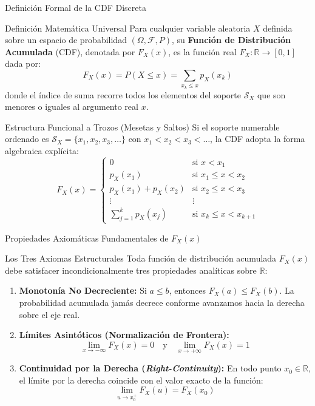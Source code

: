 \documentclass[10pt, aspectratio=169]{beamer}
\begin{document}
\begin{frame}{Definición Formal de la CDF Discreta}
  \fontsize{7.5pt}{9pt}\selectfont
  \begin{block}{Definición Matemática Universal}
    \fontsize{7.5pt}{9pt}\selectfont
    Para cualquier variable aleatoria $X$ definida sobre un espacio de probabilidad $(\Omega, \mathcal{F}, P)$, su \textbf{Función de Distribución Acumulada} (CDF), denotada por $F_X(x)$, es la función real $F_X: \mathbb{R} \to [0, 1]$ dada por:
    $$F_X(x) = P(X \le x) = \sum_{x_k \le x} p_X(x_k)$$
    donde el índice de suma recorre todos los elementos del soporte $\mathcal{S}_X$ que son menores o iguales al argumento real $x$.
  \end{block}
  \vspace{-0.15cm}
  \pause
  \begin{alertblock}{Estructura Funcional a Trozos (Mesetas y Saltos)}
    \fontsize{7.5pt}{9pt}\selectfont
    Si el soporte numerable ordenado es $\mathcal{S}_X = \{x_1, x_2, x_3, \dots\}$ con $x_1 < x_2 < x_3 < \dots$, la CDF adopta la forma algebraica explícita:
    $$F_X(x) = \begin{cases}
      0 & \text{si } x < x_1 \\
      p_X(x_1) & \text{si } x_1 \le x < x_2 \\
      p_X(x_1) + p_X(x_2) & \text{si } x_2 \le x < x_3 \\
      \vdots & \vdots \\
      \sum_{j=1}^k p_X(x_j) & \text{si } x_k \le x < x_{k+1}
    \end{cases}$$
  \end{alertblock}
\end{frame}

\begin{frame}{Propiedades Axiomáticas Fundamentales de $F_X(x)$}
  \begin{block}{Los Tres Axiomas Estructurales}
    Toda función de distribución acumulada $F_X(x)$ debe satisfacer incondicionalmente tres propiedades analíticas sobre $\mathbb{R}$:
    \begin{enumerate}\itemsep=0.15cm
      \item \textbf{Monotonía No Decreciente:} Si $a \le b$, entonces $F_X(a) \le F_X(b)$. La probabilidad acumulada jamás decrece conforme avanzamos hacia la derecha sobre el eje real.
      \item \textbf{Límites Asintóticos (Normalización de Frontera):}
      $$\lim_{x \to -\infty} F_X(x) = 0 \quad \text{y} \quad \lim_{x \to +\infty} F_X(x) = 1$$
      \item \textbf{Continuidad por la Derecha (\emph{Right-Continuity}):} En todo punto $x_0 \in \mathbb{R}$, el límite por la derecha coincide con el valor exacto de la función:
      $$\lim_{u \to x_0^+} F_X(u) = F_X(x_0)$$
    \end{enumerate}
  \end{block}
\end{frame}
\end{document}
